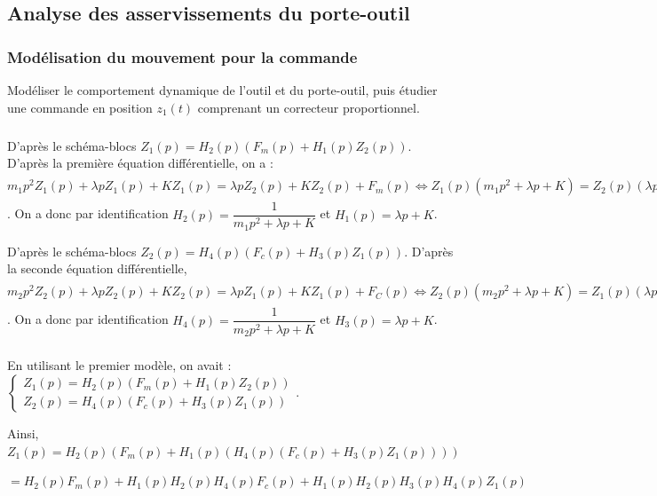 \documentclass[10pt,fleqn]{article} %
\begin{document}

\subsection{Analyse des asservissements du porte-outil}
\subsubsection{Modélisation du mouvement pour la commande}

\begin{obj}
Modéliser le comportement dynamique de l’outil et du porte-outil, puis étudier une commande  en position $z_1(t)$ comprenant un correcteur proportionnel.
\end{obj}

\subparagraph{}

D'après le schéma-blocs $Z_1(p)=H_2(p)\left(F_m(p)+H_1(p)Z_2(p)\right)$. 
D'après la première équation différentielle, on a : $m_1p^2 Z_1(p) + \lambda pZ_1(p)+KZ_1(p)=\lambda pZ_2(p)+KZ_2(p)+F_m(p)\Leftrightarrow 
Z_1(p)\left(m_1p^2  + \lambda p+K \right)=Z_2(p)\left(\lambda p+K\right)+F_m(p)
\Leftrightarrow 
Z_1(p)= \dfrac{Z_2(p)\left(\lambda p+K\right)+F_m(p)}{m_1p^2  + \lambda p+K}$.
On a donc par identification $H_2(p)=\dfrac{1}{m_1p^2  + \lambda p+K}$ et $H_1(p)=\lambda p+K$.

D'après le schéma-blocs $Z_2(p)=H_4(p)\left(F_c(p)+H_3(p)Z_1(p)\right)$. D'après la seconde équation différentielle,  $m_2p^2 Z_2(p) + \lambda pZ_2(p)+KZ_2(p)=\lambda pZ_1(p)+KZ_1(p)+F_C(p)\Leftrightarrow Z_2(p)\left( m_2p^2  + \lambda p+K \right)=Z_1(p)\left(\lambda p+K\right)+F_C(p)\Leftrightarrow Z_2(p)=\dfrac{Z_1(p)\left(\lambda p+K\right)+F_C(p)}{ m_2p^2  + \lambda p+K}$.
On a donc par identification $H_4(p)=\dfrac{1}{m_2p^2  + \lambda p+K}$ et $H_3(p)=\lambda p+K$.



\subparagraph{}
En utilisant le premier modèle, on avait :
$
\left\{\begin{array}{l}
Z_1(p)=H_2(p)\left(F_m(p)+H_1(p)Z_2(p)\right) \\
Z_2(p)=H_4(p)\left(F_c(p)+H_3(p)Z_1(p)\right)
\end{array}
\right.
$. 

Ainsi, $Z_1(p)=H_2(p)\left(F_m(p)+H_1(p)\left( H_4(p)\left(F_c(p)+H_3(p)Z_1(p)\right)\right)\right) $

$=H_2(p)F_m(p)+H_1(p)H_2(p) H_4(p)F_c(p)+H_1(p)H_2(p) H_3(p)H_4(p)Z_1(p) $
\end{document}
